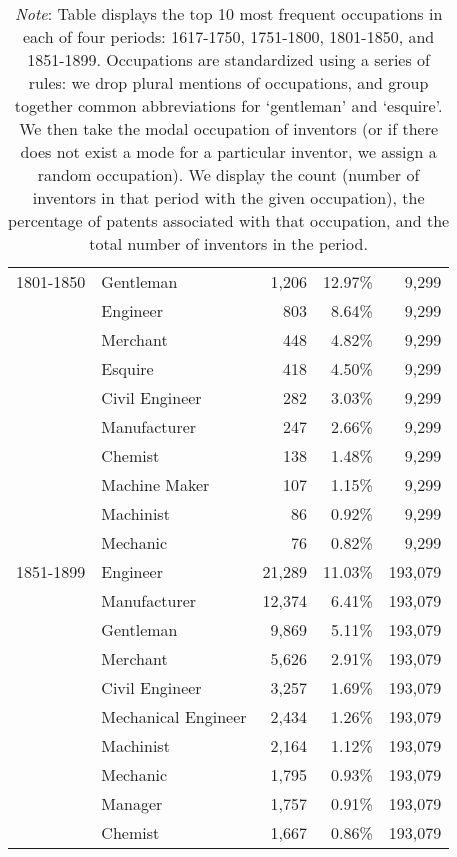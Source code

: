 \begin{table}[H]
\begin{tabular}{llrrr}
1801-1850 & Gentleman            & 1,206 &  12.97\% & 9,299 \\
          & Engineer             &   803 &   8.64\% & 9,299 \\
          & Merchant             &   448 &   4.82\% & 9,299 \\
          & Esquire              &   418 &   4.50\% & 9,299 \\
          & Civil Engineer       &   282 &   3.03\% & 9,299 \\
          & Manufacturer         &   247 &   2.66\% & 9,299 \\
          & Chemist              &   138 &   1.48\% & 9,299 \\
          & Machine Maker        &   107 &   1.15\% & 9,299 \\
          & Machinist            &    86 &   0.92\% & 9,299 \\
          & Mechanic             &    76 &   0.82\% & 9,299 \\\midrule

1851-1899 & Engineer             & 21,289 &  11.03\% & 193,079 \\
          & Manufacturer         & 12,374 &   6.41\% & 193,079 \\
          & Gentleman            & 9,869 &   5.11\% & 193,079 \\
          & Merchant             & 5,626 &   2.91\% & 193,079 \\
          & Civil Engineer       & 3,257 &   1.69\% & 193,079 \\
          & Mechanical Engineer  & 2,434 &   1.26\% & 193,079 \\
          & Machinist            & 2,164 &   1.12\% & 193,079 \\
          & Mechanic             & 1,795 &   0.93\% & 193,079 \\
          & Manager              & 1,757 &   0.91\% & 193,079 \\
          & Chemist              & 1,667 &   0.86\% & 193,079 \\
\bottomrule
\end{tabular}
\caption*{\textit{Note}: Table displays the top 10 most frequent occupations in each of four periods: 1617-1750, 1751-1800, 1801-1850, and 1851-1899. Occupations are standardized using a series of rules: we drop plural mentions of occupations, and group together common abbreviations for `gentleman' and `esquire'. We then take the modal occupation of inventors (or if there does not exist a mode for a particular inventor, we assign a random occupation). We display the count (number of inventors in that period with the given occupation), the percentage of patents associated with that occupation, and the total number of inventors in the period.}
\label{tab:occupations_total}
\end{table}